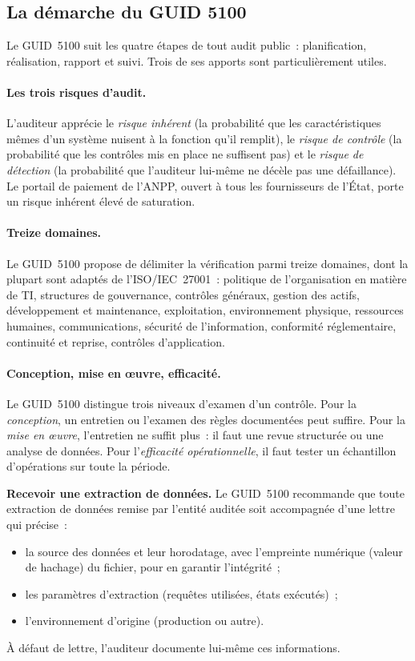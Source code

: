 \subsection{La démarche du GUID 5100}

Le GUID~5100 suit les quatre étapes de tout audit public~: planification,
réalisation, rapport et suivi. Trois de ses apports sont particulièrement
utiles.

\paragraph{Les trois risques d'audit.} L'auditeur apprécie le
\emph{risque inhérent} (la probabilité que les caractéristiques mêmes d'un
système nuisent à la fonction qu'il remplit), le \emph{risque de contrôle}
(la probabilité que les contrôles mis en place ne suffisent pas) et le
\emph{risque de détection} (la probabilité que l'auditeur lui-même ne
décèle pas une défaillance). Le portail de paiement de l'ANPP, ouvert à
tous les fournisseurs de l'État, porte un risque inhérent élevé de
saturation.

\paragraph{Treize domaines.} Le GUID~5100 propose de délimiter la
vérification parmi treize domaines, dont la plupart sont adaptés de
l'ISO/IEC~27001~: politique de l'organisation en matière de TI,
structures de gouvernance, contrôles généraux, gestion des actifs,
développement et maintenance, exploitation, environnement physique,
ressources humaines, communications, sécurité de l'information,
conformité réglementaire, continuité et reprise, contrôles
d'application.

\paragraph{Conception, mise en œuvre, efficacité.} Le GUID~5100 distingue
trois niveaux d'examen d'un contrôle. Pour la \emph{conception}, un
entretien ou l'examen des règles documentées peut suffire. Pour la
\emph{mise en œuvre}, l'entretien ne suffit plus~: il faut une revue
structurée ou une analyse de données. Pour l'\emph{efficacité
opérationnelle}, il faut tester un échantillon d'opérations sur toute la
période.

\begin{boxprocedure}
\textbf{Recevoir une extraction de données.} Le GUID~5100 recommande que
toute extraction de données remise par l'entité auditée soit accompagnée
d'une lettre qui précise~:
\begin{itemize}
    \item la source des données et leur horodatage, avec l'empreinte
          numérique (valeur de hachage) du fichier, pour en garantir
          l'intégrité~;
    \item les paramètres d'extraction (requêtes utilisées, états
          exécutés)~;
    \item l'environnement d'origine (production ou autre).
\end{itemize}
À défaut de lettre, l'auditeur documente lui-même ces informations.
\end{boxprocedure}

